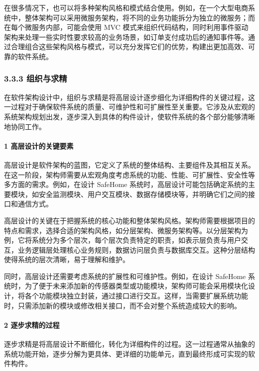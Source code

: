 在很多情况下，也可以将多种架构风格和模式结合使用。例如，在一个大型电商系统中，整体架构可以采用微服务架构，将不同的业务功能拆分为独立的微服务；而在每个微服务内部，可能会使用 MVC 模式来组织代码结构，同时利用事件驱动架构来处理一些实时性要求较高的业务场景，如订单支付成功后的通知事件等。通过合理组合这些架构风格与模式，可以充分发挥它们的优势，构建出更加高效、可靠的软件系统。

\subsubsection{3.3.3 组织与求精}\label{ux7ec4ux7ec7ux4e0eux6c42ux7cbe}

在软件架构设计中，组织与求精是将高层设计逐步细化为详细构件的关键过程，这一过程对于确保软件系统的质量、可维护性和可扩展性至关重要。它涉及从宏观的系统架构规划出发，逐步深入到具体的构件设计，使软件系统的各个部分能够清晰地协同工作。

\paragraph{1 高层设计的关键要素}\label{ux9ad8ux5c42ux8bbeux8ba1ux7684ux5173ux952eux8981ux7d20}

高层设计是软件架构的蓝图，它定义了系统的整体结构、主要组件及其相互关系。在这一阶段，架构师需要从宏观角度考虑系统的功能、性能、可扩展性、安全性等多方面的需求。例如，在设计 SafeHome 系统时，高层设计可能包括确定系统的主要模块，如安全监测模块、用户交互模块、数据存储模块等，并明确它们之间的接口和通信方式。

高层设计的关键在于把握系统的核心功能和整体架构风格。架构师需要根据项目的特点和需求，选择合适的架构风格，如分层架构、微服务架构等。以分层架构为例，它将系统分为多个层次，每个层次负责特定的职责，如表示层负责与用户交互，业务逻辑层处理核心业务规则，数据访问层负责与数据库交互。这种分层结构使得系统的层次清晰，易于理解和维护。

同时，高层设计还需要考虑系统的扩展性和可维护性。例如，在设计 SafeHome 系统时，为了便于未来添加新的传感器类型或功能模块，架构师可能会采用模块化设计，将各个功能模块独立封装，通过接口进行交互。这样，当需要扩展系统功能时，只需添加新的模块或修改相关接口，而不会对整个系统造成较大的影响。

\paragraph{2 逐步求精的过程}\label{ux9010ux6b65ux6c42ux7cbeux7684ux8fc7ux7a0b}

逐步求精是将高层设计不断细化，转化为详细构件的过程。这一过程通常从抽象的系统功能开始，逐步分解为更具体、更详细的功能单元，直到最终形成可实现的软件构件。

